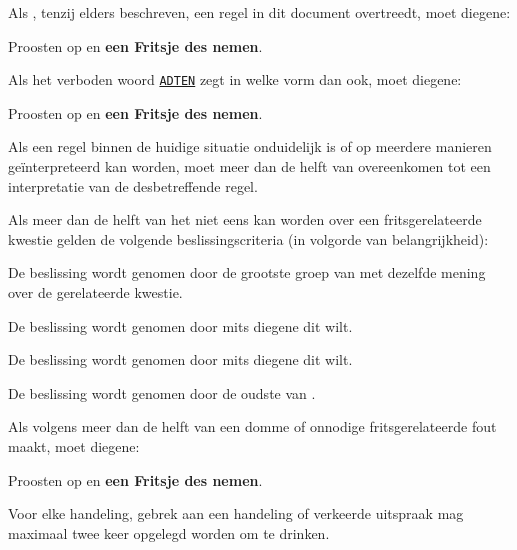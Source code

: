 \vspace{0.5cm}
\label{sec:algemeen_start}
\item Als \eenSpelerN, tenzij elders beschreven, een regel in dit document overtreedt, moet diegene:
\puntLijst{}
\item Proosten op  en \textbf{een Fritsje des nemen}\footnotemark[1].
\eindPuntLijst{}
\eindLijst{}

\vervolgLijst{}
\item Als \eenSpeler het verboden woord \ul{\texttt{ADTEN}} zegt in welke vorm dan ook, moet diegene:
\puntLijst{}
\item Proosten op  en \textbf{een Fritsje des nemen}\footnotemark[1].
\eindPuntLijst{}
\eindLijst{}

\vervolgLijst{}
\item Als een regel binnen de huidige situatie onduidelijk is of op meerdere manieren geïnterpreteerd kan worden, moet meer dan de helft van \alleSpelers overeenkomen tot een interpretatie van de desbetreffende regel.
\eindLijst{}

\vervolgLijst{}
\item \label{regel:beslissingCriteria} Als meer dan de helft van \alleSpelers het niet eens kan worden over een fritsgerelateerde kwestie gelden de volgende beslissingscriteria (in volgorde van belangrijkheid):
\numeriekeLijst{}
\item De beslissing wordt genomen door de grootste groep van \alleSpelers met dezelfde mening over de gerelateerde kwestie.
\item De beslissing wordt genomen door \Frits mits diegene dit wilt.
\item De beslissing wordt genomen door \Willem mits diegene dit wilt.
\item De beslissing wordt genomen door de oudste van \alleSpelersN.
\eindNumeriekeLijst{}
\eindLijst{}

\vervolgLijst{}
\item Als \eenSpeler volgens meer dan de helft van \alleSpelers een domme of onnodige fritsgerelateerde fout maakt, moet diegene:
\puntLijst{}
\item Proosten op  en \textbf{een Fritsje des nemen}\footnotemark[1].
\eindPuntLijst{}
\eindLijst{}

\vervolgLijst{}
\item Voor elke handeling, gebrek aan een handeling of verkeerde uitspraak mag \eenSpeler maximaal twee keer opgelegd worden om te drinken.
\eindLijst{}

